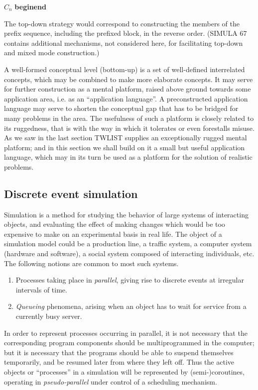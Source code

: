 \documentclass[twoside,11pt]{book}
\begin{document}
\quad $C_n$ \textbf{begin}\textemdash{}\textbf{end}

\noindent
The top-down strategy would correspond to constructing the members of the prefix sequence, including the prefixed block, in the reverse order. (SIMULA 67 contains additional mechanisms, not considered here, for facilitating top-down and mixed mode construction.)

A well-formed conceptual level (bottom-up) is a set of well-defined interrelated concepts, which may be combined to make more elaborate concepts. It may serve for further construction as a mental platform, raised above ground towards some application area, i.e. as an ``application language''. A preconstructed application language may serve to shorten the conceptual gap that has to be bridged for many problems in the area. The usefulness of such a platform is closely related to its ruggedness, that is with the way in which it tolerates or even forestalls misuse. As we saw in the last section TWLIST supplies an exceptionally rugged mental platform; and in this section we shall build on it a small but useful application language, which may in its turn be used as a platform for the solution of realistic problems.

\subsection{Discrete event simulation}

Simulation is a method for studying the behavior of large systems of interacting objects, and evaluating the effect of making changes which would be too expensive to make on an experimental basis in real life. The object of a simulation model could be a production line, a traffic system, a computer system (hardware and software), a social system composed of interacting individuals, etc. The following notions are common to most such systems.

\begin{enumerate}[wide, nosep, label=(\arabic*)]
	\item Processes taking place in \textit{parallel}, giving rise to discrete events at irregular intervals of time.
	\item \textit{Queueing} phenomena, arising when an object has to wait for service from a currently busy server.
\end{enumerate}

In order to represent processes occurring in parallel, it is not necessary that the corresponding program components should be multiprogrammed in the computer; but it is necessary that the programs should be able to suspend themselves temporarily, and be resumed later from where they left off. Thus the active objects or ``processes'' in a simulation will be represented by (semi-)coroutines, operating in \textit{pseudo-parallel} under control of a scheduling mechanism.
\end{document}
